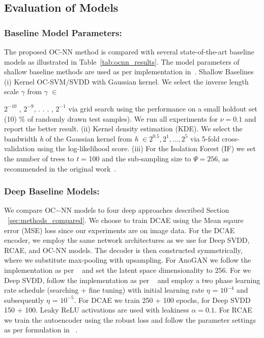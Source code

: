 \subsection{Evaluation of Models}
\label{sec:evaluationOfModels}
\subsubsection{{Baseline Model Parameters:}}
\label{sec:baselinemodel_parameters.}
The proposed OC-NN method is compared with several state-of-the-art baseline models as illustrated in Table~\ref{tab:ocnn_results}. The model parameters of shallow baseline methods are used as per implementation in~\cite{pmlrv80ruff18a}. Shallow Baselines (i) Kernel OC-SVM/SVDD with
Gaussian kernel. We select the inverse length scale $\gamma$ from
$\gamma$  $\in$ {$2^{ - 10}$ , $2^{ - 9}$, . . . , $2^{ - 1}$ via grid search using the performance on a small holdout set (10) \% of randomly drawn test samples). We run all experiments for $\nu = 0.1$ and report the better result. (ii) Kernel density estimation (KDE). We select the bandwidth \textit{h} of the Gaussian kernel from \textit{h} $ \in {2^{0.5} , 2 ^1, . . . , 2^5}$ via 5-fold cross-validation using  the log-likelihood score. (iii) For the  Isolation Forest (IF) we set the number of trees to \textit{t} = 100 and the sub-sampling size to $\Psi = 256$, as recommended in the original work~\cite{pmlrv80ruff18a}.
\vspace{-0.4cm}
\subsubsection{ {Deep Baseline Models:}}
We compare OC$-$NN models to  four deep approaches described Section ~\ref{sec:methods_compared}.
We choose to train DCAE using the Mean sqaure error (MSE) loss since our experiments are on image data. For the DCAE encoder, we employ the same network architectures as we use for Deep SVDD, RCAE, and OC-NN models. The decoder is then constructed symmetrically, where we substitute max-pooling with upsampling. For AnoGAN we follow the implementation as per ~\cite{radford2015unsupervised} and set
the latent space dimensionality to $256$.
For we Deep SVDD, follow the implementation as per ~\cite{pmlrv80ruff18a} and employ a  two phase learning rate schedule (searching + fine tuning) with initial learning rate $\eta$ = $10^{ - 4}$  and subsequently $\eta$ = $10^{ - 5}$. For DCAE we train 250 + 100 epochs, for Deep SVDD 150 + 100. Leaky ReLU activations are used with leakiness $\alpha=0.1$. For RCAE we train the autoencoder using the robust loss and follow the parameter settings as per formulation in ~\cite{chalapathy2017robust}.

}
